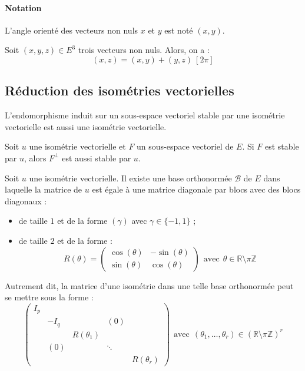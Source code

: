 \documentclass[french]{article}
\newcommand{\Z}{\mathbb{Z}}
\newcommand{\R}{\mathbb{R}}
\theoremstyle{plain}
\theoremstyle{definition}
\theoremstyle{remark}
\begin{document}
\paragraph{Notation} L'angle orienté des vecteurs non nuls $x$ et $y$ est noté $(x,y)$.

\begin{thm}{}
	Soit $(x,y,z)\in E^3$ trois vecteurs non nuls. Alors, on a : $$(x,z)=(x,y)+(y,z)\ [2\pi]$$
\end{thm}

\subsection{Réduction des isométries vectorielles}

\begin{thm}{}
	L'endomorphisme induit sur un sous-espace vectoriel stable par une isométrie vectorielle est aussi une isométrie vectorielle.
\end{thm}

\begin{thm}{}
	Soit $u$ une isométrie vectorielle et $F$ un sous-espace vectoriel de $E$. Si $F$ est stable par $u$, alors $F^\bot$ est aussi stable par $u$.
\end{thm}

\begin{thm}{}
	Soit $u$ une isométrie vectorielle. Il existe une base orthonormée $\mathcal{B}$ de $E$ dans laquelle la matrice de $u$ est égale à une matrice diagonale par blocs avec des blocs diagonaux :
	\begin{itemize}
		\item  de taille $1$ et de la forme $(\gamma)$ avec $\gamma\in\{-1,1\}$ ;
		\item de taille $2$ et de la forme : $$R(\theta)=\begin{pmatrix}
			\cos(\theta)&-\sin(\theta)\\
			\sin(\theta)&\cos(\theta)
		\end{pmatrix}\ \ \text{avec}\ \ \theta\in\R\setminus\pi\Z$$
	\end{itemize}
\end{thm}

Autrement dit, la matrice d'une isométrie dans une telle base orthonormée peut se mettre sous la forme : $$\begin{pmatrix}
	I_p&&&&\\
	&-I_q&&(0)&\\
	&&R(\theta_1)&&\\
	&(0)&&\ddots&\\
	&&&&R(\theta_r)
\end{pmatrix}\ \ \text{avec}\ \ (\theta_1,\ldots,\theta_r)\in\left(\R\setminus\pi\Z\right)^r$$
\end{document}
